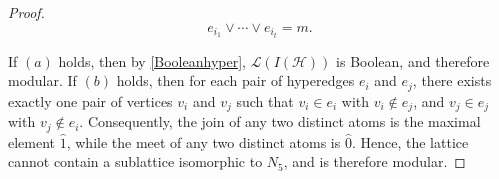 \documentclass[11pt]{amsart}
\newcommand{\LC}{\mathcal{L}}
\theoremstyle{plain}
\numberwithin{lemma}{\DefaultNumberTheoremWithin}
\numberwithin{claim}{\DefaultNumberTheoremWithin}
\numberwithin{theorem}{\DefaultNumberTheoremWithin}
\numberwithin{corollary}{\DefaultNumberTheoremWithin}
\numberwithin{proposition}{\DefaultNumberTheoremWithin}
\numberwithin{conjecture}{\DefaultNumberTheoremWithin}
\theoremstyle{definition}
\numberwithin{definition}{\DefaultNumberTheoremWithin}
\theoremstyle{definition}
\numberwithin{question}{\DefaultNumberTheoremWithin}
\theoremstyle{definition}
\numberwithin{problem}{\DefaultNumberTheoremWithin}
\theoremstyle{remark}
\numberwithin{remark}
     {\DefaultNumberTheoremWithin}
\theoremstyle{remark}
\numberwithin{example}{\DefaultNumberTheoremWithin}
\begin{document}
\begin{proof}
\[ e_{i_1} \vee \cdots \vee e_{i_t} = m. \] 



If $(a)$ holds, then by \ref{Booleanhyper}, $\LC(I(\mathcal{H}))$ is Boolean, and therefore modular.  
If $(b)$ holds, then for each pair of hyperedges $e_i$ and $e_j$, there exists exactly one pair of vertices $v_i$ and $v_j$ such that $v_i \in e_i$ with $v_i \notin e_j$, and $v_j \in e_j$ with $v_j \notin e_i$. Consequently, the join of any two distinct atoms is the maximal element $\hat{1}$, while the meet of any two distinct atoms is $\hat{0}$. Hence, the lattice cannot contain a sublattice isomorphic to $N_5$, and is therefore modular.

\end{proof}
\end{document}
